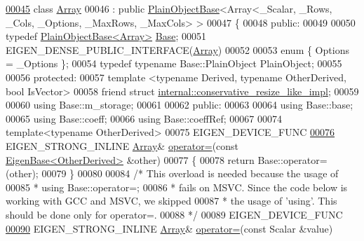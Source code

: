 \begin{DoxyCode}
\hyperlink{group___core___module}{00045} \textcolor{keyword}{class }\hyperlink{group___core___module_class_eigen_1_1_array}{Array}
00046   : \textcolor{keyword}{public} \hyperlink{class_eigen_1_1_plain_object_base}{PlainObjectBase}<Array<\_Scalar, \_Rows, \_Cols, \_Options, \_MaxRows, \_MaxCols> >
00047 \{
00048   \textcolor{keyword}{public}:
00049 
00050     \textcolor{keyword}{typedef} \hyperlink{class_eigen_1_1_plain_object_base}{PlainObjectBase<Array>} \hyperlink{class_eigen_1_1_plain_object_base}{Base};
00051     EIGEN\_DENSE\_PUBLIC\_INTERFACE(\hyperlink{group___core___module_class_eigen_1_1_array}{Array})
00052 
00053     \textcolor{keyword}{enum} \{ Options = \_Options \};
00054     \textcolor{keyword}{typedef} \textcolor{keyword}{typename} Base::PlainObject PlainObject;
00055 
00056   \textcolor{keyword}{protected}:
00057     \textcolor{keyword}{template} <\textcolor{keyword}{typename} Derived, \textcolor{keyword}{typename} OtherDerived, \textcolor{keywordtype}{bool} IsVector>
00058     \textcolor{keyword}{friend} \textcolor{keyword}{struct }\hyperlink{struct_eigen_1_1internal_1_1conservative__resize__like__impl}{internal::conservative\_resize\_like\_impl};
00059 
00060     \textcolor{keyword}{using} Base::m\_storage;
00061 
00062   \textcolor{keyword}{public}:
00063 
00064     \textcolor{keyword}{using} Base::base;
00065     \textcolor{keyword}{using} Base::coeff;
00066     \textcolor{keyword}{using} Base::coeffRef;
00067 
00074     \textcolor{keyword}{template}<\textcolor{keyword}{typename} OtherDerived>
00075     EIGEN\_DEVICE\_FUNC
\hyperlink{group___core___module_aed9cf975768953131c28096c84952a08}{00076}     EIGEN\_STRONG\_INLINE \hyperlink{group___core___module_class_eigen_1_1_array}{Array}& \hyperlink{group___core___module_aed9cf975768953131c28096c84952a08}{operator=}(\textcolor{keyword}{const} 
      \hyperlink{group___core___module_struct_eigen_1_1_eigen_base}{EigenBase<OtherDerived>} &other)
00077     \{
00078       \textcolor{keywordflow}{return} Base::operator=(other);
00079     \}
00080 
00084     \textcolor{comment}{/* This overload is needed because the usage of}
00085 \textcolor{comment}{      *   using Base::operator=;}
00086 \textcolor{comment}{      * fails on MSVC. Since the code below is working with GCC and MSVC, we skipped}
00087 \textcolor{comment}{      * the usage of 'using'. This should be done only for operator=.}
00088 \textcolor{comment}{      */}
00089     EIGEN\_DEVICE\_FUNC
\hyperlink{group___core___module_ab77cffb759a431d4a55ed150e850805a}{00090}     EIGEN\_STRONG\_INLINE \hyperlink{group___core___module_class_eigen_1_1_array}{Array}& \hyperlink{group___core___module_ab77cffb759a431d4a55ed150e850805a}{operator=}(\textcolor{keyword}{const} Scalar &value)

\end{DoxyCode}
